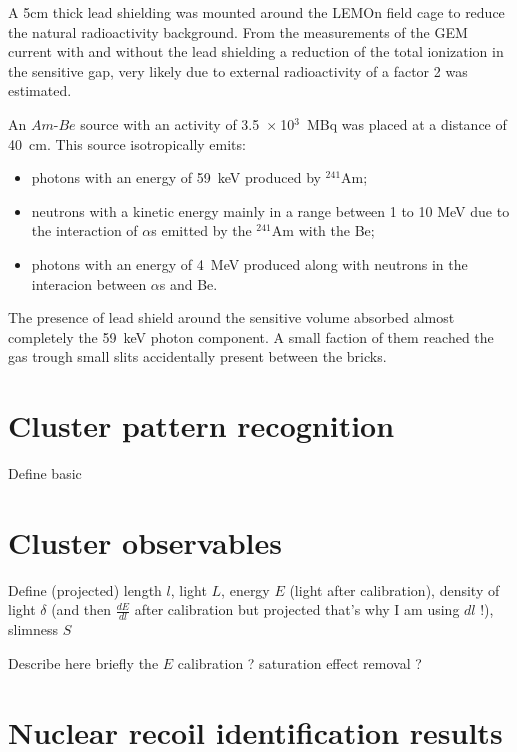 \documentclass[12pt]{iopart}
\begin{document}
A  5cm thick lead shielding was mounted around the LEMOn field cage to reduce the natural radioactivity background. From the measurements of the GEM current with and without the lead shielding a reduction of the total ionization in the sensitive gap, very likely due to external radioactivity of a factor 2 was estimated.

 An $Am$-$Be$ source with an activity of 3.5~$\times~$10$^3$~MBq was placed at a distance of 40~cm. This source isotropically emits:
 \begin{itemize}
     \item photons with an energy of 59~keV produced by $^{241}$Am;
     \item neutrons with a kinetic energy mainly in a range between 1 to 10 MeV due to the interaction of $\alpha$s emitted by the $^{241}$Am with the Be;
     \item photons with an energy of 4~MeV produced along with neutrons in the interacion between $\alpha$s and Be.
 \end{itemize}
 
The presence of lead shield around the sensitive volume absorbed almost completely the 59~keV photon component. A small faction of them reached the gas trough small slits accidentally present between the bricks.
 

 \section{Cluster pattern recognition}
 

Define basic 
 \section{Cluster observables}
 
 Define  (projected) length $l$, light $L$, energy $E$ (light after calibration), density of light $\delta$ (and then $\frac{dE}{dl}$ after calibration but projected that's why I am using $dl$ !), slimness $S$
 
 Describe here briefly the $E$ calibration ? saturation effect removal ? 
 
 \section{Nuclear recoil identification results}
 
\end{document}
